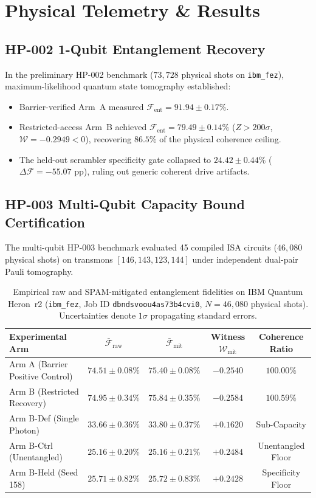 \documentclass[aps,prxquantum,reprint,superscriptaddress,floatfix]{revtex4-2}
\begin{document}
\section{Physical Telemetry \& Results}

\subsection{HP-002 1-Qubit Entanglement Recovery}
In the preliminary HP-002 benchmark ($73{,}728$ physical shots on \texttt{ibm\_fez}), maximum-likelihood quantum state tomography established:
\begin{itemize}
    \item Barrier-verified Arm~A measured $\mathcal{F}_{\mathrm{ent}} = \mathbf{91.94 \pm 0.17\%}$.
    \item Restricted-access Arm~B achieved $\mathcal{F}_{\mathrm{ent}} = \mathbf{79.49 \pm 0.14\%}$ ($Z > 200\sigma$, $\mathcal{W} = -0.2949 < 0$), recovering $86.5\%$ of the physical coherence ceiling.
    \item The held-out scrambler specificity gate collapsed to $24.42 \pm 0.44\%$ ($\Delta \mathcal{F} = -55.07\text{ pp}$), ruling out generic coherent drive artifacts.
\end{itemize}

\subsection{HP-003 Multi-Qubit Capacity Bound Certification}
The multi-qubit HP-003 benchmark evaluated 45 compiled ISA circuits ($46{,}080$ physical shots) on transmons $[146, 143, 123, 144]$ under independent dual-pair Pauli tomography.

\begin{table}[t]
\centering
\caption{Empirical raw and SPAM-mitigated entanglement fidelities on IBM Quantum Heron~r2 (\texttt{ibm\_fez}, Job ID \texttt{dbndsvoou4as73b4cvi0}, $N = 46{,}080$ physical shots). Uncertainties denote $1\sigma$ propagating standard errors.}
\label{tab:hp003_results}
\begin{tabular}{lcccc}
\toprule
Experimental Arm & $\bar{\mathcal{F}}_{\mathrm{raw}}$ & $\bar{\mathcal{F}}_{\mathrm{mit}}$ & Witness $\mathcal{W}_{\mathrm{mit}}$ & Coherence Ratio \\
\midrule
Arm A (Barrier Positive Control) & $74.51 \pm 0.08\%$ & $\mathbf{75.40 \pm 0.08\%}$ & $-0.2540$ & $100.00\%$ \\
Arm B (Restricted Recovery) & $74.95 \pm 0.34\%$ & $\mathbf{75.84 \pm 0.35\%}$ & $\mathbf{-0.2584}$ & $\mathbf{100.59\%}$ \\
Arm B-Def (Single Photon) & $33.66 \pm 0.36\%$ & $33.80 \pm 0.37\%$ & $+0.1620$ & Sub-Capacity \\
Arm B-Ctrl (Unentangled) & $25.16 \pm 0.20\%$ & $25.16 \pm 0.21\%$ & $+0.2484$ & Unentangled Floor \\
Arm B-Held (Seed 158) & $25.71 \pm 0.82\%$ & $25.72 \pm 0.83\%$ & $+0.2428$ & Specificity Floor \\
\bottomrule
\end{tabular}
\end{table}
\end{document}
